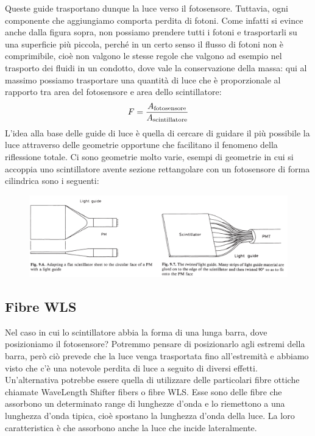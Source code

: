 Queste guide trasportano dunque la luce verso il fotosensore. Tuttavia, ogni componente che aggiungiamo comporta perdita di fotoni. Come infatti si evince anche dalla figura sopra, non possiamo prendere tutti i fotoni e trasportarli su una superficie più piccola, perché in un certo senso il flusso di fotoni non è comprimibile, cioè non valgono le stesse regole che valgono ad esempio nel trasporto dei fluidi in un condotto, dove vale la conservazione della massa: qui al massimo possiamo trasportare una quantità di luce che è proporzionale al rapporto tra area del fotosensore e area dello scintillatore:
\begin{equation*}
   F=\frac{A_{\rm fotosensore}}{A_{\rm scintillatore}}
\end{equation*}
L'idea alla base delle guide di luce è quella di cercare di guidare il più possibile la luce attraverso delle geometrie opportune che facilitano il fenomeno della riflessione totale. Ci sono geometrie molto varie, esempi di geometrie in cui si accoppia uno scintillatore avente sezione rettangolare con un fotosensore di forma cilindrica sono i seguenti:
\begin{figure}[H]
   \centering
   \includegraphics[width=\textwidth]{immagini/guide_di_luce.png}
\end{figure}
\subsection{Fibre WLS}
Nel caso in cui lo scintillatore abbia la forma di una lunga barra, dove posizioniamo il fotosensore? Potremmo pensare di posizionarlo agli estremi della barra, però ciò prevede che la luce venga trasportata fino all'estremità e abbiamo visto che c'è una notevole perdita di luce a seguito di diversi effetti. Un'alternativa potrebbe essere quella di utilizzare delle particolari fibre ottiche chiamate WaveLength Shifter fibers o fibre WLS. Esse sono delle fibre che assorbono un determinato range di lunghezze d'onda e lo riemettono a una lunghezza d'onda tipica, cioè spostano la lunghezza d'onda della luce. La loro caratteristica è che assorbono anche la luce che incide lateralmente.

